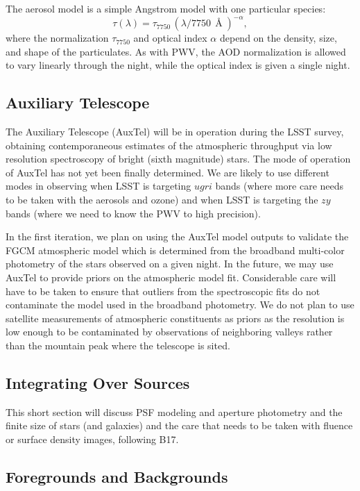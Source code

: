 \documentclass[SE,authoryear,lsstdraft,toc]{lsstdoc}
\begin{document}
The aerosol model is a simple Angstrom model with one particular species:
%
\begin{equation}
\tau(\lambda) = \tau_{7750}\,(\lambda/7750\,\Angstrom)^{-\alpha},
\end{equation}
%
where the normalization $\tau_{7750}$ and optical index $\alpha$ depend on the density, size, and shape of the particulates.
As with PWV, the AOD normalization is allowed to vary linearly through the night, while the optical index is given a single night.

\subsection{Auxiliary Telescope}

The Auxiliary Telescope (AuxTel) will be in operation during the LSST survey,
obtaining contemporaneous estimates of the atmospheric throughput via low
resolution spectroscopy of bright (sixth magnitude) stars.  The mode of
operation of AuxTel has not yet been finally determined.  We are likely to use
different modes in observing when LSST is targeting $ugri$ bands (where more
care needs to be taken with the aerosols and ozone) and when LSST is targeting
the $zy$ bands (where we need to know the PWV to high precision).

In the first iteration, we plan on using the AuxTel model outputs to validate
the FGCM atmospheric model which is determined from the broadband multi-color
photometry of the stars observed on a given night.  In the future, we may use
AuxTel to provide priors on the atmospheric model fit.  Considerable care will
have to be taken to ensure that outliers from the spectroscopic fits do not
contaminate the model used in the broadband photometry.  We do not plan to use
satellite measurements of atmospheric constituents as priors as the resolution
is low enough to be contaminated by observations of neighboring valleys rather
than the mountain peak where the telescope is sited.

\subsection{Integrating Over Sources}

This short section will discuss PSF modeling and aperture photometry and the
finite size of stars (and galaxies) and the care that needs to be taken with
fluence or surface density images, following B17.

\subsection{Foregrounds and Backgrounds}
\label{sec:photom:backgrounds}
\end{document}
